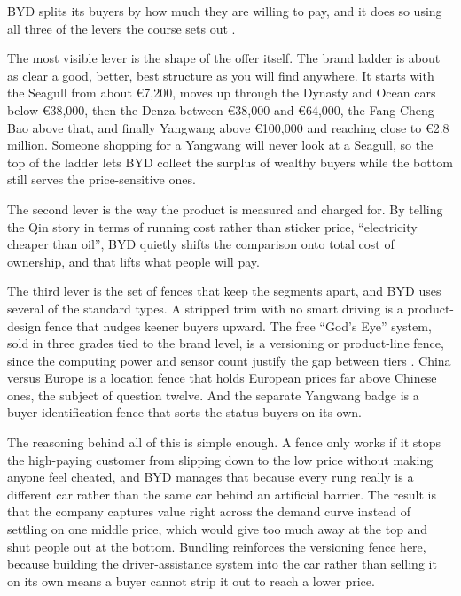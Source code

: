 
BYD splits its buyers by how much they are willing to pay, and it does so using all three of the levers the course sets out \cite{nagle2018}.

The most visible lever is the shape of the offer itself. The brand ladder is about as clear a good, better, best structure as you will find anywhere. It starts with the Seagull from about \euro7{,}200, moves up through the Dynasty and Ocean cars below \euro38{,}000, then the Denza between \euro38{,}000 and \euro64{,}000, the Fang Cheng Bao above that, and finally Yangwang above \euro100{,}000 and reaching close to \euro2.8 million. Someone shopping for a Yangwang will never look at a Seagull, so the top of the ladder lets BYD collect the surplus of wealthy buyers while the bottom still serves the price-sensitive ones.

The second lever is the way the product is measured and charged for. By telling the Qin story in terms of running cost rather than sticker price, ``electricity cheaper than oil'', BYD quietly shifts the comparison onto total cost of ownership, and that lifts what people will pay.

The third lever is the set of fences that keep the segments apart, and BYD uses several of the standard types. A stripped trim with no smart driving is a product-design fence that nudges keener buyers upward. The free ``God's Eye'' system, sold in three grades tied to the brand level, is a versioning or product-line fence, since the computing power and sensor count justify the gap between tiers \cite{insidechinaADAS}. China versus Europe is a location fence that holds European prices far above Chinese ones, the subject of question twelve. And the separate Yangwang badge is a buyer-identification fence that sorts the status buyers on its own.

The reasoning behind all of this is simple enough. A fence only works if it stops the high-paying customer from slipping down to the low price without making anyone feel cheated, and BYD manages that because every rung really is a different car rather than the same car behind an artificial barrier. The result is that the company captures value right across the demand curve instead of settling on one middle price, which would give too much away at the top and shut people out at the bottom. Bundling reinforces the versioning fence here, because building the driver-assistance system into the car rather than selling it on its own means a buyer cannot strip it out to reach a lower price.
